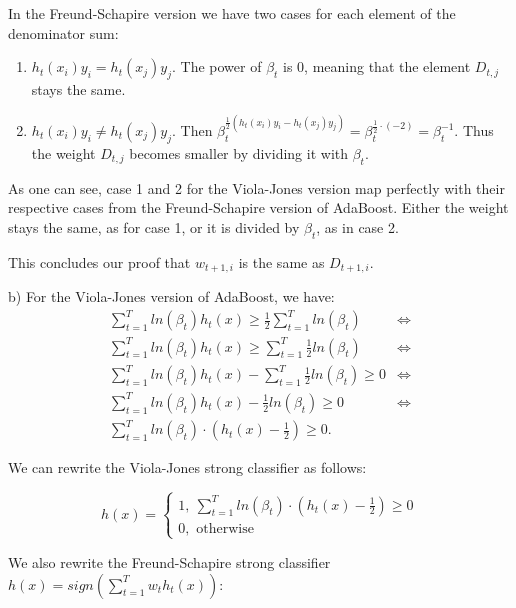\documentclass{article}
\newcommand{\<}{\langle}
\renewcommand{\>}{\rangle}
\theoremstyle{definition}
\begin{document}
\newpage

In the Freund-Schapire version we have two cases for each element of the denominator sum:
\vspace{-1mm}
\begin{enumerate}
    \item $h_t(x_i)y_i = h_t(x_j)y_j$. The power of $\beta_t$ is 0, meaning that the element $D_{t, j}$ stays the same.
    \item $h_t(x_i)y_i \neq h_t(x_j)y_j$. Then $\beta_t^{\frac{1}{2} (h_t(x_i)y_i - h_t(x_j)y_j)} = \beta_t^{\frac{1}{2} \cdot (-2)} = \beta_t^{-1}$. Thus the weight $D_{t,j}$ becomes smaller by dividing it with $\beta_t$.
\end{enumerate}

As one can see, case 1 and 2 for the Viola-Jones version map perfectly with their respective cases from the Freund-Schapire version of AdaBoost. Either the weight stays the same, as for case 1, or it is divided by $\beta_t$, as in case 2.

This concludes our proof that $w_{t+1,i}$ is the same as $D_{t+1,i}$.

\vspace{1mm}

b) For the Viola-Jones version of AdaBoost, we have:
\[
\begin{aligned}
    \sum_{t = 1}^{T} ln(\beta_t) h_t(x) \geq \frac{1}{2} \sum_{t=1}^{T} ln(\beta_t) & \Leftrightarrow \\
    \sum_{t = 1}^{T} ln(\beta_t) h_t(x) \geq  \sum_{t=1}^{T} \frac{1}{2} ln(\beta_t) & \Leftrightarrow \\
    \sum_{t = 1}^{T} ln(\beta_t) h_t(x) - \sum_{t=1}^{T} \frac{1}{2} ln(\beta_t) \geq 0 & \Leftrightarrow \\
    \sum_{t = 1}^{T} ln(\beta_t) h_t(x) - \frac{1}{2} ln(\beta_t) \geq 0 & \Leftrightarrow \\
    \sum_{t = 1}^{T} ln(\beta_t) \cdot (h_t(x) - \frac{1}{2}) \geq 0.
\end{aligned}
\]

We can rewrite the Viola-Jones strong classifier as follows:

$$h(x)=
\begin{cases}
1, \ \sum_{t = 1}^{T} ln(\beta_t) \cdot (h_t(x) - \frac{1}{2}) \geq 0\\
0, \text{ otherwise}
\end{cases}
$$

We also rewrite the Freund-Schapire strong classifier $h(x) = sign(\sum_{t=1}^{T} w_t h_t(x))$:
\end{document}
